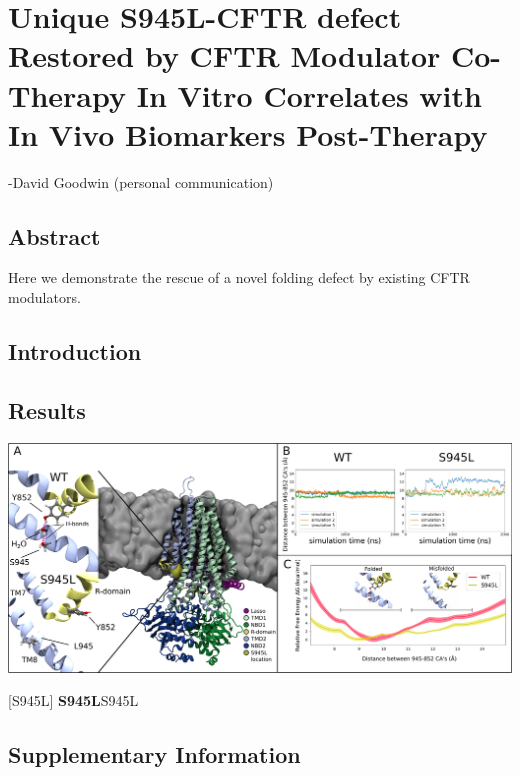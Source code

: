 \chapter{Unique S945L-CFTR defect Restored by CFTR Modulator Co-Therapy In Vitro Correlates with In Vivo Biomarkers Post-Therapy}
\label{chap:S945L}

\setcounter{figure}{0}
\renewcommand{\thefigure}{\arabic{chapter}.\arabic{figure}}

 {-David Goodwin (personal communication)}

\section*{\centering Abstract} 

Here we demonstrate the rescue of a novel folding defect by existing CFTR modulators.

\section{Introduction}
\section{Results}

\begin{center}
	\includegraphics[width=\textwidth]{figures/S945L/Figure1_MD_03082022.pdf}
\end{center}
	\captionsetup{singlelinecheck = false, justification=raggedright}
\begingroup
{}[S945L] {\textbf{S945L}}{S945L}
\label{S945L_MD_1}
\endgroup

\section {Supplementary Information}
\renewcommand{\thefigure}{\arabic{chapter}.S\arabic{figure}}

